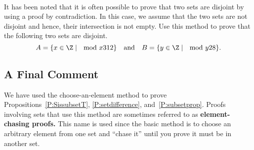 \begin{prog} \label{prog:disjointsets} \hfill \\
It has been noted that it is often possible to prove that two sets are disjoint by using a proof by contradiction.  In this case, we assume that the two sets are not disjoint and hence, their intersection is not empty.  Use this method to prove that the following two sets are disjoint.
\[
A = \{ x \in \Z \mid \mod{x}{3}{12} \} \quad \text{and} \quad B = \{ y \in \Z \mid \mod{y}{2}{8} \}.
\]
\end{prog}
\hbreak


\subsection*{A Final Comment}
We have used the choose-an-element method
%
 to prove Propositions~\ref{P:SissubsetT}, \ref{P:setdifference}, \linebreak 
and~\ref{P:subsetprop}.  Proofs involving sets that use this method are sometimes referred to as \textbf{element-chasing proofs.}
%
%
  This name is used since the basic method is to choose an arbitrary element from one set and ``chase it'' until you prove it must be in another set.
\hbreak

\endinput
